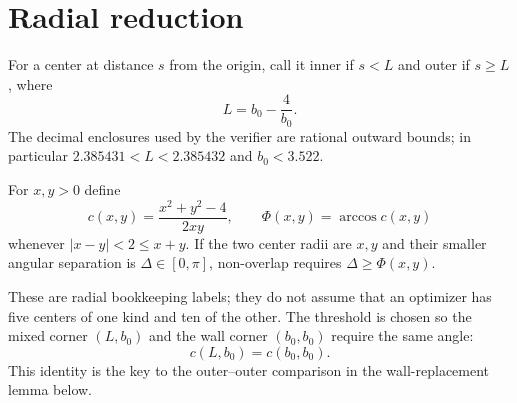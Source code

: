 \documentclass[11pt]{article}
\theoremstyle{definition}
\newcommand{\ph}{\Phi}
\begin{document}
\section{Radial reduction}\label{sec:radial}

For a center at distance $s$ from the origin, call it inner if $s<L$ and outer if $s\ge L$, where
\begin{equation}\label{eq:L}
 L=b_0-\frac4{b_0}.
\end{equation}
The decimal enclosures used by the verifier are rational outward bounds; in particular $2.385431<L<2.385432$ and $b_0<3.522$.

For $x,y>0$ define
\[
 c(x,y)=\frac{x^2+y^2-4}{2xy},\qquad \ph(x,y)=\arccos c(x,y)
\]
whenever $|x-y|<2\le x+y$. If the two center radii are $x,y$ and their smaller angular separation is $\Delta\in[0,\pi]$, non-overlap requires $\Delta\ge\ph(x,y)$.

These are radial bookkeeping labels; they do not assume that an optimizer has five centers of one kind and ten of the other. The threshold is chosen so the mixed corner $(L,b_0)$ and the wall corner $(b_0,b_0)$ require the same angle:
\[
 c(L,b_0)=c(b_0,b_0).
\]
This identity is the key to the outer--outer comparison in the wall-replacement lemma below.
\end{document}
